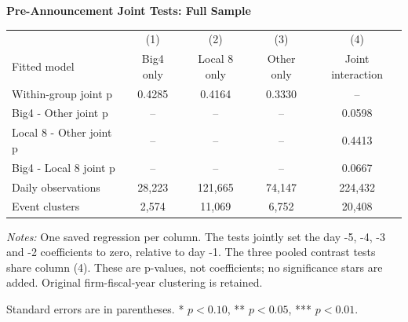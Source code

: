 \documentclass[10pt]{article}
\begin{document}
\begin{minipage}{18.40cm}
\fontsize{10}{12}\selectfont
\setlength{\tabcolsep}{4pt}\renewcommand{\arraystretch}{1.08}
{\large\bfseries Pre-Announcement Joint Tests: Full Sample}\par\medskip
\begin{tabular*}{\linewidth}{@{\extracolsep{\fill}}lcccc@{}}
\toprule
 & (1) & (2) & (3) & (4) \\
Fitted model & Big4 only & Local 8 only & Other only & Joint interaction \\
\midrule
Within-group joint p & 0.4285 & 0.4164 & 0.3330 & -- \\
Big4 - Other joint p & -- & -- & -- & 0.0598 \\
Local 8 - Other joint p & -- & -- & -- & 0.4413 \\
Big4 - Local 8 joint p & -- & -- & -- & 0.0667 \\
\midrule
Daily observations & 28,223 & 121,665 & 74,147 & 224,432 \\
Event clusters & 2,574 & 11,069 & 6,752 & 20,408 \\
\bottomrule\end{tabular*}\par\medskip
\fontsize{9}{11}\selectfont\textit{Notes:} One saved regression per column. The tests jointly set the day -5, -4, -3 and -2 coefficients to zero, relative to day -1. The three pooled contrast tests share column (4). These are p-values, not coefficients; no significance stars are added. Original firm-fiscal-year clustering is retained.
\par Standard errors are in parentheses. * $p<0.10$, ** $p<0.05$, *** $p<0.01$.
\end{minipage}
\end{document}
